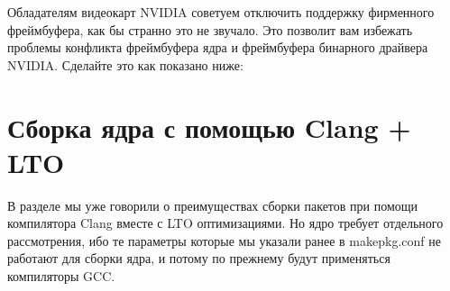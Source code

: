 \documentclass[letterpaper,10pt,russian,openany]{sphinxmanual}
\begin{document}
\sphinxAtStartPar
{}

\noindent{}

\sphinxAtStartPar
{}

\noindent{}

\sphinxAtStartPar
{} Обладателям видеокарт NVIDIA советуем отключить поддержку фирменного фреймбуфера, как бы странно это не звучало.
Это позволит вам избежать проблемы конфликта фреймбуфера ядра и фреймбуфера бинарного драйвера NVIDIA. Сделайте это
как показано ниже:

\sphinxAtStartPar
{}

\noindent{}

\sphinxAtStartPar
{}

\noindent{}

\sphinxAtStartPar
{}

\noindent{}

\sphinxAtStartPar
{}

\noindent{}

\sphinxAtStartPar
{}

\noindent{}

\ignorespaces 

\section{Сборка ядра с помощью Clang + LTO}
\label{\detokenize{source/custom-kernels:clang-lto}}\label{\detokenize{source/custom-kernels:kernel-with-clang-lto}}\label{\detokenize{source/custom-kernels:index-7}}
\sphinxAtStartPar
В разделе 
мы уже говорили о преимуществах сборки пакетов при помощи компилятора Clang вместе с LTO оптимизациями.
Но ядро требует отдельного рассмотрения, ибо те параметры которые мы указали ранее в makepkg.conf не работают для сборки ядра,
и потому по прежнему будут применяться компиляторы GCC.
\end{document}
